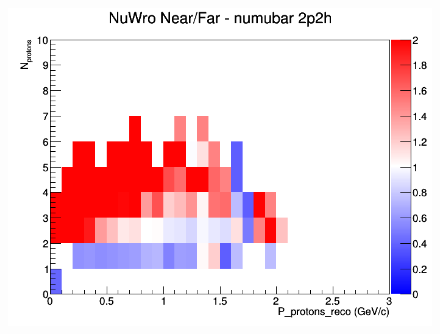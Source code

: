 \begin{figure}[h]
\endminipage
{}
\includegraphics[width=\linewidth]{eff_N_P/GAr/protons/ratios/2p2h_NuWro_numubar_NF_N_P.png}
\endminipage
\newline
\end{figure}
\clearpage
